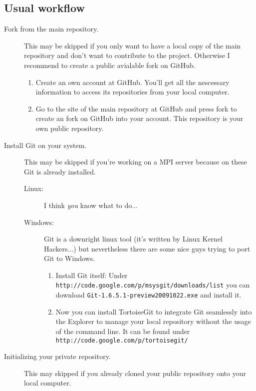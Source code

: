 \documentclass[a4paper,10pt]{scrartcl}
\begin{document}
\subsection*{Usual workflow}
\begin{description}
  \item[Fork from the main repository.] This may be skipped if you only want to have a local copy of the main repository and don't want to contribute to the project. Otherwise I recommend to create a public avialable fork on GitHub.

    \begin{enumerate}
      \item Create an own account at GitHub. You'll get all the nescessary information to access its repositories from your local computer.
      \item Go to the site of the main repository at GitHub and press fork to create an fork on GitHub into your account. This repository is your own public repository.
    \end{enumerate}
  \item[Install Git on your system.] This may be skipped if you're working on a MPI server because on these Git is already installed.
    \begin{description}
      \item[Linux:] I think \textit{you} know what to do...
      \item[Windows:] Git is a downright linux tool (it's written by Linux Kernel Hackers...) but nevertheless there are some nice guys trying to port Git to Windows.
        \begin{enumerate}
          \item Install Git itself: Under \texttt{http://code.google.com/p/msysgit/downloads/list} you can download \texttt{Git-1.6.5.1-preview20091022.exe} and install it.
          \item Now you can install TortoiseGit to integrate Git seamlessly into the Explorer to manage your local repository without the usage of the command line. It can be found under \texttt{http://code.google.com/p/tortoisegit/}
        \end{enumerate}
    \end{description}
  \item[Initializing your private repository.] This may skipped if you already cloned your public repository onto your local computer.

\end{description}
\end{document}

